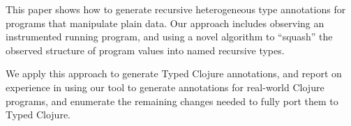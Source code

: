This paper shows how to
generate recursive heterogeneous type annotations for
programs that manipulate plain data.
Our approach includes observing an instrumented running program,
and using a novel algorithm to ``squash'' the observed structure
of program values into named recursive types.

We apply this approach to generate Typed Clojure annotations,
and report on experience in using our tool to generate annotations for real-world
Clojure programs, and enumerate the remaining changes needed to fully port
them to Typed Clojure.


%
%
%
%

